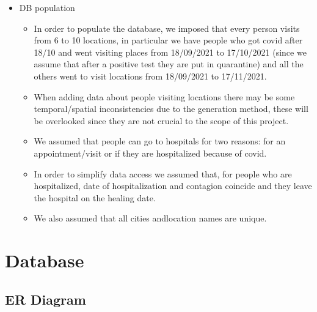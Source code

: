 \documentclass[12pt, a4paper]{article}
\begin{document}
\begin{itemize}
    \item DB population
    \begin{itemize}
        \item[] In order to populate the database, we imposed that every person 
            visits from 6 to 10 locations, in particular we have people who 
            got covid after 18/10 and went visiting places from 18/09/2021 to 
            17/10/2021 (since we assume that after a positive test they are put 
            in quarantine) and all the others went to visit locations from 
            18/09/2021 to 17/11/2021. 
        \item[] When adding data about people visiting locations there may be
            some temporal/spatial inconsistencies due to the generation method,
            these will be overlooked since they are not crucial to the scope of
            this project. 
        \item[] We assumed that people can go to hospitals for two reasons: for
            an appointment/visit or if they are hospitalized because of covid.
        \item[] In order to simplify data access we assumed that, for people who
            are hospitalized, date of hospitalization and contagion coincide 
            and they leave the hospital on the healing date.
        \item[] We also assumed that all cities andlocation names are unique.
    \end{itemize}

\end{itemize}
  
\clearpage

\section{Database}

\subsection{ER Diagram}
\end{document}
